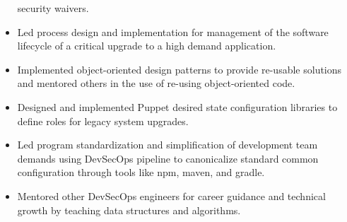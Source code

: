 \documentclass[12pt, line, margin]{res}
\begin{document}
\begin{resume}
\begin{itemize}
                          security waivers.
              \item   Led process design and implementation for management of the 
                          software lifecycle of a critical upgrade to a high demand \newline
                          application.
              \item   Implemented object-oriented design patterns to provide re-usable solutions
                          and mentored others in the use of re-using object-oriented code.
              \item   Designed and implemented Puppet desired state configuration \newline 
                          libraries to define roles for legacy system upgrades.
              \item   Led program standardization and simplification of development team 
                          demands using DevSecOps pipeline to canonicalize standard common
                          configuration through tools like npm, maven, and gradle.
              \item   Mentored other DevSecOps engineers for career guidance and
                          technical growth by teaching data structures and algorithms.
            \end{itemize}


\end{resume}
\end{document}
